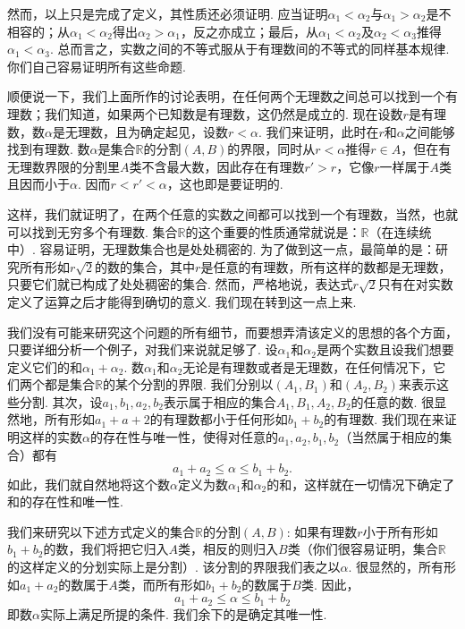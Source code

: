 \documentclass[color=cyan,mathpazo,titlestyle=hang]{elegantbook_mac}
\begin{document}
然而，以上只是完成了定义，其性质还必须证明. 应当证明$\alpha_1<\alpha_2$与$\alpha_1>\alpha_2$是不相容的；从$\alpha_1<\alpha_2$得出$\alpha_2>\alpha_1$，反之亦成立；最后，从$\alpha_1<\alpha_2$及$\alpha_2<\alpha_3$推得$\alpha_1<\alpha_3$. 总而言之，实数之间的不等式服从于有理数间的不等式的同样基本规律. 你们自己容易证明所有这些命题. 

顺便说一下，我们上面所作的讨论表明，在任何两个无理数之间总可以找到一个有理数；我们知道，如果两个已知数是有理数，这仍然是成立的. 现在设数$r$是有理数，数$\alpha$是无理数，且为确定起见，设数$r<\alpha$. 我们来证明，此时在$r$和$\alpha$之间能够找到有理数. 数$\alpha$是集合$\mathbb{R}$的分割$(A,B)$的界限，同时从$r<\alpha$推得$r\in A$，但在有无理数界限的分割里$A$类不含最大数，因此存在有理数$r'>r$，它像$r$一样属于$A$类且因而小于$\alpha$. 因而$r<r'<\alpha$，这也即是要证明的. 

这样，我们就证明了，在两个任意的实数之间都可以找到一个有理数，当然，也就可以找到无穷多个有理数. 集合$\mathbb{R}$的这个重要的性质通常就说是：$\mathbb{R}$（在连续统中）. 容易证明，无理数集合也是处处稠密的. 为了做到这一点，最简单的是：研究所有形如$r\sqrt{2}$的数的集合，其中$r$是任意的有理数，所有这样的数都是无理数，只要它们就已构成了处处稠密的集合. 然而，严格地说，表达式$r\sqrt{2}$只有在对实数定义了运算之后才能得到确切的意义. 我们现在转到这一点上来. 

我们没有可能来研究这个问题的所有细节，而要想弄清该定义的思想的各个方面，只要详细分析一个例子，对我们来说就足够了. 设$\alpha_1$和$\alpha_2$是两个实数且设我们想要定义它们的和$\alpha_1+\alpha_2$. 数$\alpha_1$和$\alpha_2$无论是有理数或者是无理数，在任何情况下，它们两个都是集合$\mathbb{R}$的某个分割的界限. 我们分别以$(A_1,B_1)$和$(A_2,B_2)$来表示这些分割. 其次，设$a_1,b_1,a_2,b_2$表示属于相应的集合$A_1,B_1,A_2,B_2$的任意的数. 很显然地，所有形如$a_1+a+2$的有理数都小于任何形如$b_1+b_2$的有理数. 我们现在来证明这样的实数$\alpha$的存在性与唯一性，使得对任意的$a_1,a_2,b_1,b_2$（当然属于相应的集合）都有
$$a_1+a_2\leqslant \alpha \leqslant b_1+b_2.$$
如此，我们就自然地将这个数$\alpha$定义为数$\alpha_1$和$\alpha_2$的和，这样就在一切情况下确定了和的存在性和唯一性. 

我们来研究以下述方式定义的集合$\mathbb{R}$的分割$(A,B)$: 如果有理数$r$小于所有形如$b_1+b_2$的数，我们将把它归入$A$类，相反的则归入$B$类（你们很容易证明，集合$\mathbb{R}$的这样定义的分划实际上是分割）. 该分割的界限我们表之以$\alpha$. 很显然的，所有形如$a_1+a_2$的数属于$A$类，而所有形如$b_1+b_2$的数属于$B$类. 因此，
\begin{equation}
a_1+a_2\leqslant \alpha \leqslant b_1+b_2
\label{real_number_addition}
\end{equation}
即数$\alpha$实际上满足所提的条件. 我们余下的是确定其唯一性. 
\end{document}
